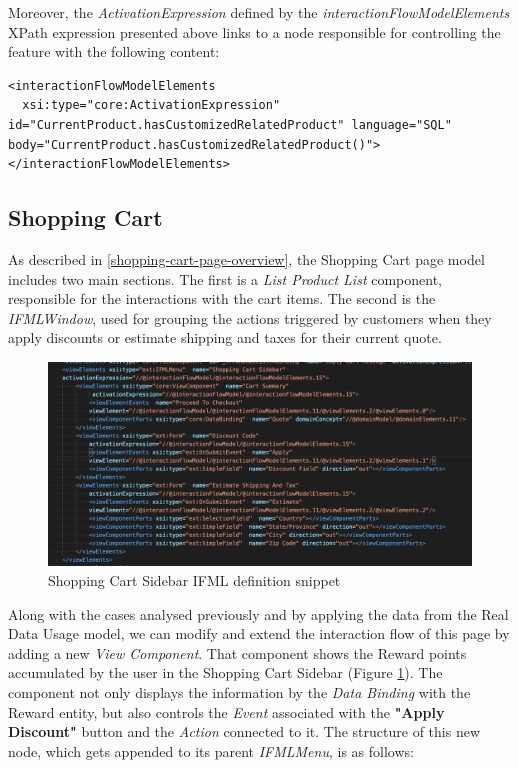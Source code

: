 Moreover, the \textit{ActivationExpression} defined by the \textit{interactionFlowModelElements} XPath expression presented above links to a node responsible for controlling the feature with the following content:

\vspace{0.5cm}
\lstset{language=XML}
\begin{lstlisting} 
<interactionFlowModelElements 
  xsi:type="core:ActivationExpression" id="CurrentProduct.hasCustomizedRelatedProduct" language="SQL" body="CurrentProduct.hasCustomizedRelatedProduct()">
</interactionFlowModelElements>

\end{lstlisting}
\vspace{0.5cm}
\subsection{Shopping Cart}
\label{shopping-cart-updates}

As described in \ref{shopping-cart-page-overview}, the Shopping Cart page model includes two main sections. The first is a \textit{List Product List} component, responsible for the interactions with the cart items. The second is the \textit{IFMLWindow}, used for grouping the actions triggered by customers when they apply discounts or estimate shipping and taxes for their current quote.

\vspace{0.5cm}
\begin{figure}[H]
  \centering
    \includegraphics[width=12cm]{images/madison/ifml-shopping-cart-sidebar.png}
  \caption{Shopping Cart Sidebar IFML definition snippet}
  \label{fig:shopping-cart-sidebar-ifml-definition}
\end{figure}
\vspace{0.5cm}

Along with the cases analysed previously and by applying the data from the Real Data Usage model, we can modify and extend the interaction flow of this page by adding a new \textit{View Component}. That component shows the Reward points accumulated by the user in the Shopping Cart Sidebar (Figure \ref{fig:shopping-cart-sidebar-ifml-definition}). The component not only displays the information by the \textit{Data Binding} with the Reward entity, but also controls the \textit{Event} associated with the \textbf{"Apply Discount"} button and the \textit{Action} connected to it. 
The structure of this new node, which gets appended to its parent \textit{IFMLMenu}, is as follows:

